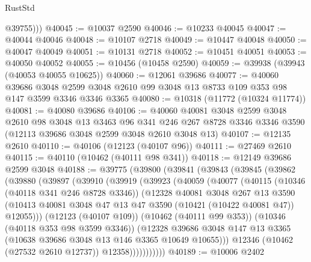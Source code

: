 \begin{lexlean}{RustStd}
\begin{coremodule}
          @39755)))
@40045 := @10037 @2590
@40046 := @10233 @40045
@40047 := @40044 @40046
@40048 := @10107 @2718
@40049 := @10447 @40048
@40050 := @40047 @40049
@40051 := @10131 @2718
@40052 := @10451 @40051
@40053 := @40050 @40052
@40055 := @10456 (@10458 @2590)
@40059 := @39938 (@39943 (@40053 @40055 @10625))
@40060 := @12061 @39686
@40077 := @40060
    @39686
    @3048
    @2599
    @3048
    @2610
    @99
    @3048
    @13
    @8733
    @109
    @353
    @98
    @147
    @3599
    @3346
    @3346
    @3365
@40080 := @10318 (@11772 (@10324 @11774))
@40081 := @40080 @39686
@40106 := @40060
    @40081
    @3048
    @2599
    @3048
    @2610
    @98
    @3048
    @13
    @3463
    @96
    @341
    @246
    @267
    @8728
    @3346
    @3346
    @3590
    (@12113 @39686 @3048 @2599 @3048 @2610 @3048 @13)
@40107 := @12135 @2610
@40110 := @40106 (@12123 (@40107 @96))
@40111 := @27469 @2610
@40115 := @40110 (@10462 (@40111 @98 @341))
@40118 := @12149 @39686 @2599 @3048
@40188 := @39775
    (@39800
      (@39841
        (@39843
          (@39845
            (@39862
              (@39880
                (@39897
                  (@39910
                    (@39919
                      (@39923
                        (@40059
                          (@40077
                            (@40115
                              (@10346 (@40118 @341 @246 @8728 @3346))
                              (@12328
                                @40081
                                @3048
                                @267
                                @13
                                @3590
                                (@10413
                                  @40081
                                  @3048
                                  @47
                                  @13
                                  @47
                                  @3590
                                  (@10421 (@10422 @40081 @47))
                                  @12055)))
                            (@12123 (@40107 @109))
                            (@10462 (@40111 @99 @353))
                            (@10346 (@40118 @353 @98 @3599 @3346))
                            (@12328
                              @39686
                              @3048
                              @147
                              @13
                              @3365
                              (@10638 @39686 @3048 @13 @146 @3365 @10649 @10655)))
                          @12346
                          (@10462 (@27532 @2610 @12737))
                          @12358)))))))))))
@40189 := @10006 @2402

\end{coremodule}
\end{lexlean}
